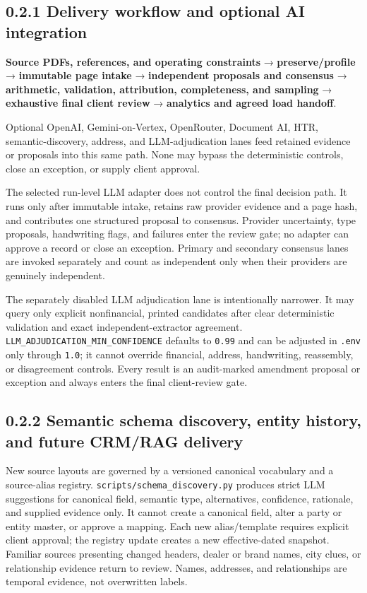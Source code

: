 \documentclass[
]{article}
\begin{document}
\subsection{0.2.1 Delivery workflow and optional AI
integration}\label{delivery-workflow-and-optional-ai-integration}

\textbf{Source PDFs, references, and operating constraints} →
\textbf{preserve/profile} → \textbf{immutable page intake} →
\textbf{independent proposals and consensus} → \textbf{arithmetic,
validation, attribution, completeness, and sampling} →
\textbf{exhaustive final client review} → \textbf{analytics and agreed
load handoff}.

Optional OpenAI, Gemini-on-Vertex, OpenRouter, Document AI, HTR,
semantic-discovery, address, and LLM-adjudication lanes feed retained
evidence or proposals into this same path. None may bypass the
deterministic controls, close an exception, or supply client approval.

The selected run-level LLM adapter does not control the final decision
path. It runs only after immutable intake, retains raw provider evidence
and a page hash, and contributes one structured proposal to consensus.
Provider uncertainty, type proposals, handwriting flags, and failures
enter the review gate; no adapter can approve a record or close an
exception. Primary and secondary consensus lanes are invoked separately
and count as independent only when their providers are genuinely
independent.

The separately disabled LLM adjudication lane is intentionally narrower.
It may query only explicit nonfinancial, printed candidates after clear
deterministic validation and exact independent-extractor agreement.
\texttt{LLM\_\allowbreak{}ADJUDICATION\_\allowbreak{}MIN\_\allowbreak{}CONFIDENCE}
defaults to \texttt{0.99} and can be adjusted in \texttt{.env} only
through \texttt{1.0}; it cannot override financial, address,
handwriting, reassembly, or disagreement controls. Every result is an
audit-marked amendment proposal or exception and always enters the final
client-review gate.

\subsection{0.2.2 Semantic schema discovery, entity history, and future
CRM/RAG
delivery}\label{semantic-schema-discovery-entity-history-and-future-crmrag-delivery}

New source layouts are governed by a versioned canonical vocabulary and
a source-alias registry.
\texttt{scripts/\allowbreak{}schema\_\allowbreak{}discovery.py} produces
strict LLM suggestions for canonical field, semantic type, alternatives,
confidence, rationale, and supplied evidence only. It cannot create a
canonical field, alter a party or entity master, or approve a mapping.
Each new alias/template requires explicit client approval; the registry
update creates a new effective-dated snapshot. Familiar sources
presenting changed headers, dealer or brand names, city clues, or
relationship evidence return to review. Names, addresses, and
relationships are temporal evidence, not overwritten labels.
\end{document}
